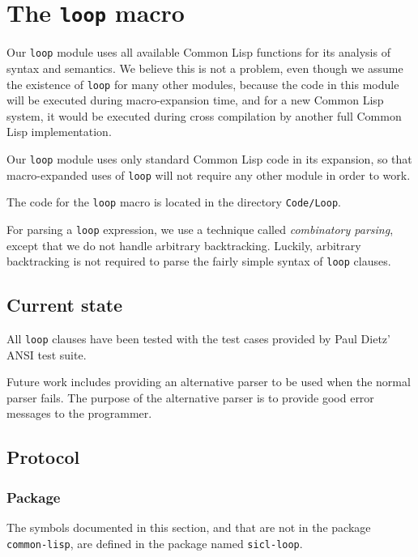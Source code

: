 \chapter{The \texttt{loop} macro} 

Our \texttt{loop} module uses all available Common Lisp functions for
its analysis of syntax and semantics.  We believe this is not a
problem, even though we assume the existence of \texttt{loop} for many
other modules, because the code in this module will be executed during
macro-expansion time, and for a new Common Lisp system, it would be
executed during cross compilation by another full Common Lisp
implementation.

Our \texttt{loop} module uses only standard Common Lisp code in its
expansion, so that macro-expanded uses of \texttt{loop} will not
require any other \sysname{} module in order to work.

The code for the \sysname{} \texttt{loop} macro is located in the
directory \texttt{Code/Loop}.  

For parsing a \texttt{loop} expression, we use a technique called
\emph{combinatory parsing}, except that we do not handle arbitrary
backtracking.  Luckily, arbitrary backtracking is not required to
parse the fairly simple syntax of \texttt{loop} clauses.

\section{Current state}

All \texttt{loop} clauses have been tested with the test cases
provided by Paul Dietz' ANSI \commonlisp{} test suite.

Future work includes providing an alternative parser to be used when
the normal parser fails.  The purpose of the alternative parser is to
provide good error messages to the programmer.

\section{Protocol}

\subsection{Package}

The symbols documented in this section, and that are not in the
package \texttt{common-lisp}, are defined in the package named
\texttt{sicl-loop}.

